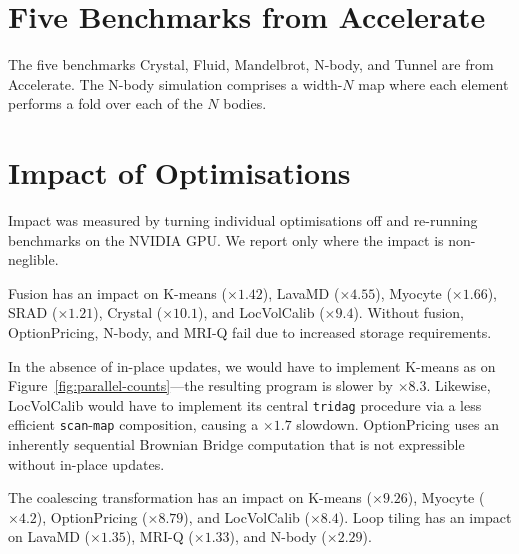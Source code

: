 \section{Five Benchmarks from Accelerate}
\label{sec:accelerate}

The five benchmarks Crystal, Fluid, Mandelbrot, N-body, and Tunnel are
from Accelerate.  The N-body simulation comprises a width-$N$ map
where each element performs a fold over each of the $N$ bodies.

\section{Impact of Optimisations}

Impact was measured by turning individual optimisations off and
re-running benchmarks on the NVIDIA GPU.  We report only where
the impact is non-neglible.

Fusion has an impact on K-means ($\times1.42$), LavaMD
($\times4.55$), Myocyte ($\times1.66$), SRAD ($\times1.21$), Crystal
($\times10.1$), and LocVolCalib ($\times9.4$).  Without fusion,
OptionPricing, N-body, and MRI-Q fail due to increased
storage requirements.

In the absence of in-place updates, we would have to implement
K-means as on Figure~\ref{fig:parallel-counts}---the resulting
program is slower by $\times8.3$.  Likewise, LocVolCalib
would have to implement its central \lstinline{tridag} procedure via a
less efficient \lstinline{scan}-\lstinline{map} composition, causing a
$\times1.7$ slowdown.  OptionPricing uses an inherently sequential
Brownian Bridge computation that is not expressible without in-place
updates.

The coalescing transformation has an impact on K-means
($\times9.26$), Myocyte ($\times4.2$), OptionPricing ($\times 8.79$),
and LocVolCalib ($\times 8.4$).
%
Loop tiling has an impact on LavaMD ($\times 1.35$), MRI-Q
($\times1.33$), and N-body ($\times 2.29$).


